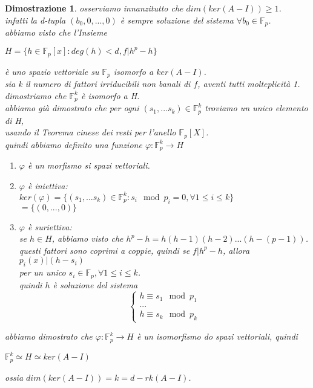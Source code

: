 \documentclass[a4paper,12pt]{article}
\theoremstyle{def}
\theoremstyle{prop}
\theoremstyle{esempio}
\theoremstyle{dimostrazione}
\newtheorem*{dimostrazione}{Dimostrazione}
\theoremstyle{teo}
\theoremstyle{osservazione}
\begin{document}
\begin{dimostrazione}
    osserviamo innanzitutto che \(dim(ker(A - I)) \geq 1\).\\
    infatti la d-tupla \((b_0, 0 , ..., 0)\) è sempre soluzione del sistema \(\forall b_0 \in \mathbb{F}_p\).\\
    abbiamo visto che l'Insieme
    \begin{center}
        \(H = \{ h \in \mathbb{F}_p[x] : deg (h) < d, f | h^p - h\}\)
    \end{center}
    è uno spazio vettoriale su \(\mathbb{F}_p\) isomorfo a \(ker(A - I)\).\\
    sia k il numero di fattori irriducibili non banali di \(f\), aventi tutti molteplicità 1.\\
    dimostriamo che \(\mathbb{F}_p^k\) è isomorfo a H.\\
    abbiamo già dimostrato che per ogni \((s_1, ... s_k) \in \mathbb{F}_p^k\) troviamo un unico elemento di H,\\
    usando il Teorema cinese dei resti per l'anello \(\mathbb{F}_p[X]\).\\
    quindi abbiamo definito una funzione \(\varphi : \mathbb{F}_p^k \rightarrow H\)
    \begin{enumerate}
        \item \(\varphi\) è un morfismo si spazi vettoriali.
        \item \(\varphi\) è iniettiva:\\
                \(ker(\varphi) = \{(s_1, ... s_k) \in \mathbb{F}_p^k : s_i \mod p_i = 0, \forall 1 \leq i \leq k\}\)\\
                \(=\{(0, ... , 0)\}\)
        \item \(\varphi\) è suriettiva:\\
                se \(h \in H\), abbiamo visto che \(h^p - h = h (h - 1)(h - 2)...(h - (p - 1))\).\\
                questi fattori sono coprimi a coppie, quindi se \(f | h^p - h\), allora \(p_i(x) | (h - s_i)\)\\
                per un unico \(s_i \in \mathbb{F}_p, \forall 1 \leq i \leq k\).\\
                quindi \(h\) è soluzione del sistema
                \[
                \begin{cases}
                    h \equiv s_1 \mod p_1\\
                    ...\\
                    h \equiv s_k \mod p_k
                \end{cases}
                \]
    \end{enumerate}
    abbiamo dimostrato che \(\varphi : \mathbb{F}_p^k \rightarrow H \) è un isomorfismo do spazi vettoriali, quindi
    \begin{center}
        \(\mathbb{F}_p^k \simeq H \simeq ker(A - I)\)
    \end{center}
    ossia \(dim(ker(A - I)) = k = d - rk(A - I)\).
\end{dimostrazione}
\end{document}
